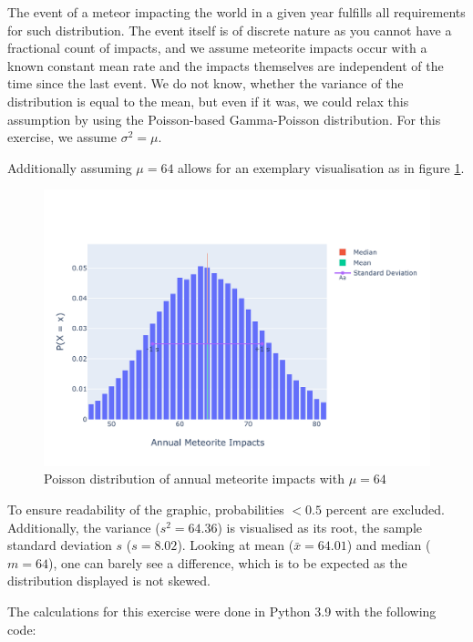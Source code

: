 The event of a meteor impacting the world in a given year fulfills all requirements for such distribution. The event itself is of discrete nature as you cannot have a fractional count of impacts, and we assume meteorite impacts occur with a known constant mean rate and the impacts themselves are independent of the time since the last event. We do not know, whether the variance of the distribution is equal to the mean, but even if it was, we could relax this assumption by using the Poisson-based Gamma-Poisson distribution. For this exercise, we assume $\sigma^2 = \mu$. 

Additionally assuming $\mu = 64$ allows for an exemplary visualisation as in figure \ref{fig:1b}.

\begin{figure}[h]
\centering
\includegraphics[width=16cm]{pics/1b.pdf}
\caption{Poisson distribution of annual meteorite impacts with $\mu = 64$}
\label{fig:1b}
\end{figure}
\FloatBarrier

To ensure readability of the graphic, probabilities $<0.5$ percent are excluded. Additionally, the variance ($s^2 = 64.36$) is visualised as its root, the sample standard deviation $s$ ($s = 8.02$). Looking at mean ($\bar{x} = 64.01$) and median ($m = 64$), one can barely see a difference, which is to be expected as the distribution displayed is not skewed. 

The calculations for this exercise were done in Python 3.9 with the following code: 

